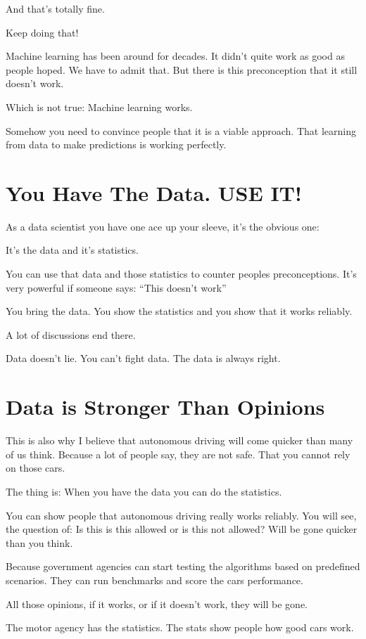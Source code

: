 \documentclass[12pt, numbers=noenddot]{scrreprt} %
\begin{document}
And that’s totally fine.

Keep doing that!

Machine learning has been around for decades. It didn’t quite work as good as people hoped. We have to admit that. But there is this preconception that it still doesn’t work.

Which is not true: Machine learning works.

Somehow you need to convince people that it is a viable approach. That learning from data to make predictions is working perfectly.

\section{You Have The Data. USE IT!}

As a data scientist you have one ace up your sleeve, it’s the obvious one:

It’s the data and it’s statistics.

You can use that data and those statistics to counter peoples preconceptions. It’s very powerful if someone says: “This doesn’t work”

You bring the data. You show the statistics and you show that it works reliably.

A lot of discussions end there.

Data doesn’t lie. You can’t fight data.
The data is always right.

\section{Data is Stronger Than Opinions}

This is also why I believe that autonomous driving will come quicker than many of us think. Because a lot of people say, they are not safe. That you cannot rely on those cars.

The thing is: When you have the data you can do the statistics.

You can show people that autonomous driving really works reliably. You will see, the question of: Is this is this allowed or is this not allowed? Will be gone quicker than you think.

Because government agencies can start testing the algorithms based on predefined scenarios. They can run benchmarks and score the cars performance.

All those opinions, if it works, or if it doesn’t work, they will be gone.

The motor agency has the statistics. The stats show people how good cars work.
\end{document}
